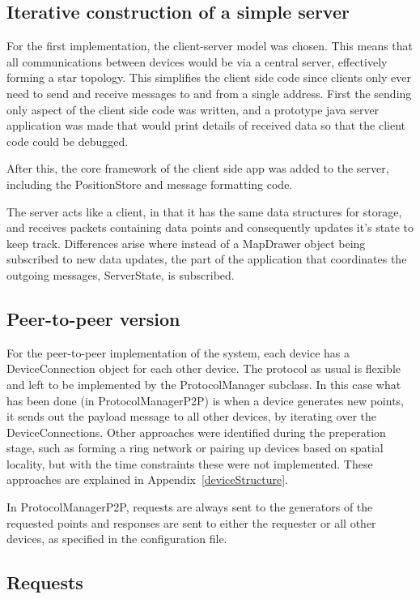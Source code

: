 \subsection{Iterative construction of a simple server}

For the first implementation, the client-server model was chosen. This means that all communications between devices would be via a central server, effectively forming a star topology.
This simplifies the client side code since clients only ever need to send and receive messages to and from a single address.
First the sending only aspect of the client side code was written, and a prototype java server application was made that would print details of received data so that the client code could be debugged.

After this, the core framework of the client side app was added to the server, including the PositionStore and message formatting code.

The server acts like a client, in that it has the same data structures for storage, and receives packets containing data points and consequently updates it's state to keep track. Differences arise where instead of a MapDrawer object being subscribed to new data updates, the part of the application that coordinates the outgoing messages, ServerState, is subscribed.

\subsection{Peer-to-peer version}

For the peer-to-peer implementation of the system, each device has a DeviceConnection object for each other device. The protocol as usual is flexible and left to be implemented by the ProtocolManager subclass. In this case what has been done (in ProtocolManagerP2P) is when a device generates new points, it sends out the payload message to all other devices, by iterating over the DeviceConnections. Other approaches were identified during the preperation stage, such as forming a ring network or pairing up devices based on spatial locality, but with the time constraints these were not implemented. These approaches are explained in Appendix~\ref{deviceStructure}.

In ProtocolManagerP2P, requests are always sent to the generators of the requested points and responses are sent to either the requester or all other devices, as specified in the configuration file.

\subsection{Requests}
\label{requests}

